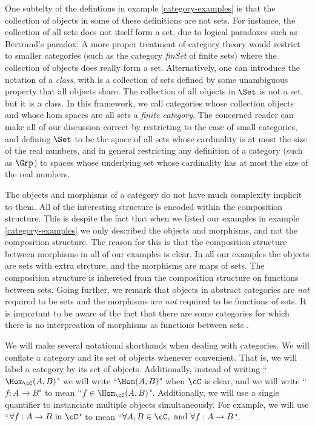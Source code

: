 \begin{warn}
One subtelty of the defintions in example \ref{category-examples} is that the collection of objects in some of these definitions are not sets. For instance, the collection of all sets does not itself form a set, due to logical paradoxes such as Bertrand's paradox. A more proper treatment of category theory would restrict to smaller categories (such as the category {\em finSet} of finite sets) where the collection of objects does really form a set. Alternatively, one can introduce the notation of a {\em class}, with is a collection of sets defined by some unambiguous property that all objects share. The collection of all objects in $\Set$ is not a set, but it is a class. In this framework, we call categories whose collection objects and whose hom spaces are all sets a {\em finite category}. The concerned reader can make all of our discussion correct by restricting to the case of small categories, and defining $\Set$ to be the space of all sets whose cardinality is at most the size of the real numbers, and in general restricting any definition of a category (such as $\Grp$) to spaces whose underlying set whose cardinality has at most the size of the real numbers.
\end{warn}

\begin{rem}The objects and morphisms of a category do not have much complexity implicit to them.  All of the interesting structure is encoded within the composition structure. This is despite the fact that when we listed our examples in example \ref{category-examples} we only described the objects and morphisms, and not the composition structure. The reason for this is that the composition structure between morphisms in all of our examples is clear. In all our examples the objects are sets with extra strcture, and the morphisms are maps of sets. The composition structure is inhereted from the composition structure on functions between sets. Going further, we remark that objects in abstract categories are {\em not} required to be sets and the morphisms are {\em not} required to be functions of sets. It is important to be aware of the fact that there are some categories for which there is no interpreation of morphisms as functions between sets \cite{freyd1970homotopy}.
\end{rem}

\begin{rem} We will make several notational shorthands when dealing with categories.  We will conflate a category and its set of objects whenever convenient. That is, we will label a category by its set of objects. Additionally, instead of writing ``$\Hom_{\cC}(A,B)$" we will write ``$\Hom(A,B)$" when $\cC$ is clear, and we will write ``$f:A\to B$" to mean ``$f\in \Hom_{\cC}(A,B)$". Additionally, we will use a single quantifier to instanciate multiple objects simultaneously. For example, we will use ``$\forall f:A\to B \text{ in }\cC$" to mean ``$\forall A,B\in \cC,\text{ and }\forall f:A\to B$".
\end{rem}


